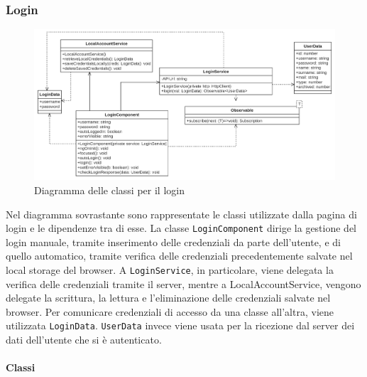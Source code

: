\subsubsection{Login}
\begin{figure}[H]
	\centering
	\includegraphics[width=18cm]{res/images/webapp-login-diagrammaClassi.png}
	\caption{Diagramma delle classi per il login}
	\label{fig:DiagrammaClassiLogin}
\end{figure}
Nel diagramma sovrastante sono rappresentate le classi utilizzate dalla pagina di login e le dipendenze tra di esse. La classe \texttt{LoginComponent} dirige la gestione del login manuale, tramite inserimento delle credenziali da parte dell'utente, e di quello automatico, tramite verifica delle credenziali precedentemente salvate nel local storage del browser. A \texttt{LoginService}, in particolare, viene delegata la verifica delle credenziali tramite il server, mentre a LocalAccountService, vengono delegate la scrittura, la lettura e l'eliminazione delle credenziali salvate nel browser. Per comunicare credenziali di accesso da una classe all'altra, viene utilizzata \texttt{LoginData}. \texttt{UserData} invece viene usata per la ricezione dal server dei dati dell'utente che si è autenticato.

\paragraph{Classi}


